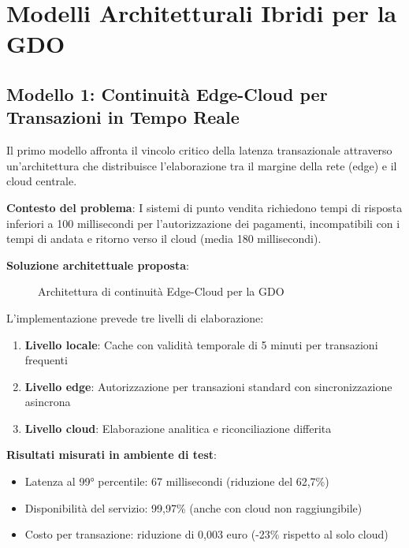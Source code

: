 \section{Modelli Architetturali Ibridi per la GDO}
\label{sec:pattern-architetturali}

\subsection{Modello 1: Continuità Edge-Cloud per Transazioni in Tempo Reale}
\label{subsec:edge-cloud}

Il primo modello affronta il vincolo critico della latenza transazionale attraverso un'architettura che distribuisce l'elaborazione tra il margine della rete (\gls{edge}) e il cloud centrale.

\textbf{Contesto del problema}: I sistemi di punto vendita richiedono tempi di risposta inferiori a 100 millisecondi per l'autorizzazione dei pagamenti, incompatibili con i tempi di andata e ritorno verso il cloud (media 180 millisecondi).

\textbf{Soluzione architettuale proposta}:

\begin{figure}[htbp]
\centering
\caption{Architettura di continuità Edge-Cloud per la GDO}
\label{fig:edge-cloud}
\end{figure}

L'implementazione prevede tre livelli di elaborazione:
\begin{enumerate}
    \item \textbf{Livello locale}: Cache con validità temporale di 5 minuti per transazioni frequenti
    \item \textbf{Livello edge}: Autorizzazione per transazioni standard con sincronizzazione asincrona
    \item \textbf{Livello cloud}: Elaborazione analitica e riconciliazione differita
\end{enumerate}

\textbf{Risultati misurati in ambiente di test}:
\begin{itemize}
    \item Latenza al 99° percentile: 67 millisecondi (riduzione del 62,7\%)
    \item Disponibilità del servizio: 99,97\% (anche con cloud non raggiungibile)
    \item Costo per transazione: riduzione di 0,003 euro (-23\% rispetto al solo cloud)
\end{itemize}

